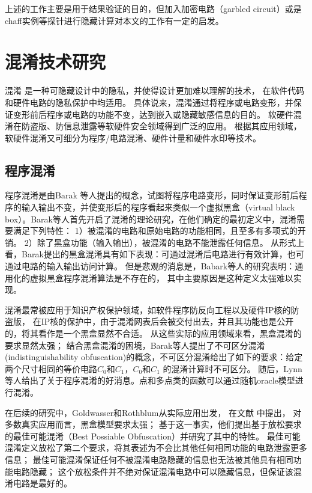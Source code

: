 上述的工作主要是用于结果验证的目的，但加入加密电路（garbled circuit）或是chaff实例等探针进行隐藏计算对本文的工作有一定的启发。

\section{混淆技术研究}
混淆 是一种可隐藏设计中的隐私，并使得设计更加难以理解的技术，
在软件代码和硬件电路的隐私保护中均适用。
具体说来，混淆通过将程序或电路变形，并保证变形前后程序或电路的功能不变，达到嵌入或隐藏敏感信息的目的。
软硬件混淆在防盗版、防信息泄露等软硬件安全领域得到广泛的应用。
根据其应用领域，软硬件混淆又可细分为程序/电路混淆、硬件计量和硬件水印等技术。

\subsection{程序混淆}

程序混淆是由Barak 等人提出的概念，试图将程序电路变形，同时保证变形前后程序的输入输出不变，并使变形后的程序看起来类似一个虚拟黑盒（virtual black box）。Barak等人首先开启了混淆的理论研究，在他们确定的最初定义中，混淆需要满足下列特性：
1）被混淆的电路和原始电路的功能相同，且至多有多项式的开销。
2）除了黑盒功能（输入输出），被混淆的电路不能泄露任何信息。
从形式上看，Barak提出的黑盒混淆具有如下表现：可通过混淆后电路进行有效计算，也可通过电路的输入输出访问计算。
但是悲观的消息是，Babark等人的研究表明：通用化的虚拟黑盒程序混淆算法是不存在的，
其中主要原因是这种定义太强难以实现。

混淆最常被应用于知识产权保护领域，如软件程序防反向工程以及硬件IP核的防盗版，
在IP核的保护中，由于混淆网表后会被交付出去，并且其功能也是公开的，将其看作是一个黑盒显然不合适。
从这些实际的应用领域来看，黑盒混淆的要求显然太强；
结合黑盒混淆的困境，Barak等人提出了不可区分混淆(indistinguishability obfuscation)的概念，不可区分混淆给出了如下的要求：给定两个尺寸相同的等价电路$C_0$和$C_1$，$C_0$和$C_1$ 的混淆计算时不可区分。
随后，Lynn 等人给出了关于程序混淆的好消息。点和多点类的函数可以通过随机oracle模型进行混淆。

在后续的研究中，Goldwasser和Rothblum从实际应用出发，
在文献 中提出，
对多数真实应用而言，黑盒模型要求太强；
基于这一事实，他们提出基于放松要求的最佳可能混淆（Best Possiable Obfuscation）并研究了其中的特性。
最佳可能混淆定义放松了第二个要求，将其表述为不会比其他任何相同功能的电路泄露更多信息；
最佳可能混淆保证任何不被混淆电路隐藏的信息也无法被其他具有相同功能电路隐藏；
这个放松条件并不绝对保证混淆电路中可以隐藏信息，但保证该混淆电路是最好的。

